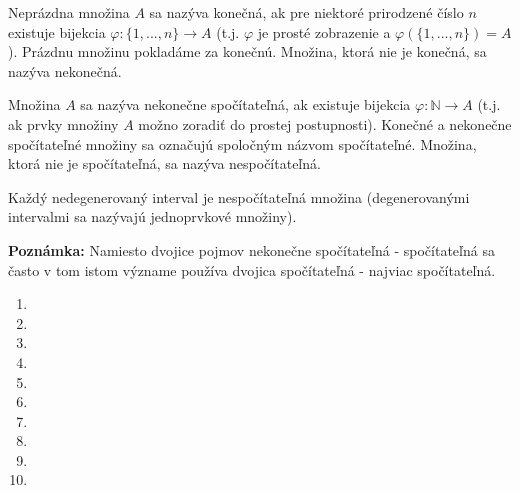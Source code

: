 Neprázdna množina $A$ sa nazýva konečná, ak pre niektoré prirodzené číslo $n$
existuje bijekcia $\varphi:\{1,...,n\}\rightarrow A$ (t.j. $\varphi$ je prosté
zobrazenie
a $\varphi(\{1,...,n\})=A$). Prázdnu množinu pokladáme za konečnú. Množina,
ktorá nie je konečná, sa nazýva nekonečná.

Množina $A$ sa nazýva nekonečne spočítateľná, ak existuje bijekcia
$\varphi:\mathbb{N}\rightarrow A$ (t.j. ak prvky množiny $A$ možno zoradiť do
prostej postupnosti). Konečné a nekonečne spočítateľné množiny sa označujú
spoločným názvom spočítateľné. Množina, ktorá nie je spočítateľná, sa nazýva
nespočítateľná.

\begin{veta}
Každý nedegenerovaný interval je nespočítateľná množina (degenerovanými
intervalmi sa nazývajú jednoprvkové množiny).
\end{veta}

\textbf{Poznámka:} Namiesto dvojice pojmov nekonečne spočítateľná - spočítateľná
sa často v tom istom význame používa dvojica spočítateľná - najviac
spočítateľná.

\begin{enumerate}[resume]
  \item {}
  \item {}
  \item {}
  \item {}
  \item {}
  \item {}
  \item {}
  \item {}
  \item {}
  \item {}
\end{enumerate}

